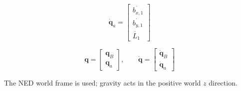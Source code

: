\documentclass[11pt]{article}
\begin{document}
\begin{equation}
\dot{\boldsymbol q}_a=\begin{bmatrix}\dot{b_{x,1}}\\\dot{b_{y,1}}\\\dot{L_{1}}\end{bmatrix}
\end{equation}

\begin{equation}
\boldsymbol q=\begin{bmatrix}\boldsymbol q_B\\\boldsymbol q_a\end{bmatrix},\qquad \dot{\boldsymbol q}=\begin{bmatrix}\dot{\boldsymbol q}_B\\\dot{\boldsymbol q}_a\end{bmatrix}
\end{equation}

The NED world frame is used; gravity acts in the positive world $z$ direction.
\end{document}
